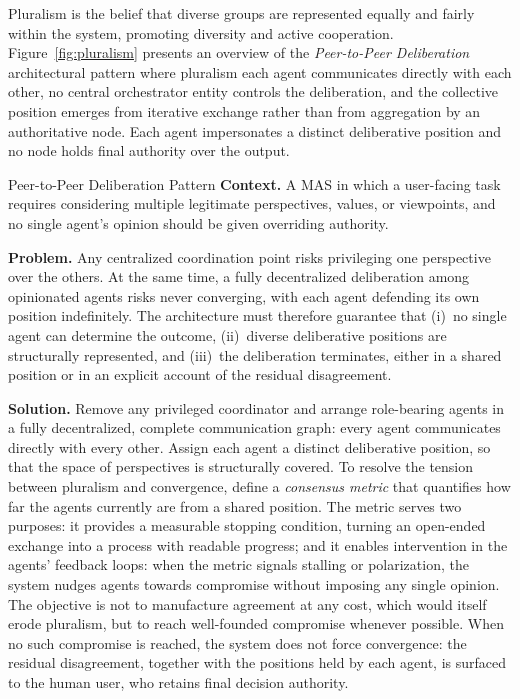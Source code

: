 \documentclass[sigconf,nonacm]{acmart}
\begin{document}
Pluralism is the belief that diverse groups are represented equally and fairly within the system, promoting diversity and active cooperation.
Figure~\ref{fig:pluralism} presents an overview of the \textit{Peer-to-Peer Deliberation} architectural pattern where pluralism each agent communicates directly with each other, no central orchestrator entity controls the deliberation, and the collective position
emerges from iterative exchange rather than from aggregation by an authoritative node.
Each agent impersonates a distinct deliberative position and no node holds final authority over the output.

\begin{discussionbox}{Peer-to-Peer Deliberation Pattern}
\textbf{Context.} A MAS in which a user-facing task requires
considering multiple legitimate perspectives, values, or viewpoints,
and no single agent's opinion should be given overriding authority.

\textbf{Problem.} Any centralized coordination point risks
privileging one perspective over the others. At the same time, a
fully decentralized deliberation among opinionated agents risks
never converging, with each agent defending its own position
indefinitely. The architecture must therefore guarantee that
(i)~no single agent can determine the outcome, (ii)~diverse
deliberative positions are structurally represented, and (iii)~the
deliberation terminates, either in a shared position or in an
explicit account of the residual disagreement.

\textbf{Solution.} Remove any privileged coordinator and arrange
role-bearing agents in a fully decentralized, complete communication
graph: every agent communicates directly with every other. Assign
each agent a distinct deliberative position, so that the space of
perspectives is structurally covered. To resolve the tension between
pluralism and convergence, define a \textit{consensus metric} that
quantifies how far the agents currently are from a shared position.
The metric serves two purposes: it provides a measurable stopping
condition, turning an open-ended exchange into a process with
readable progress; and it enables intervention in the agents'
feedback loops: when the metric signals stalling or polarization,
the system nudges agents towards compromise without imposing any
single opinion. The objective is not to manufacture agreement at any
cost, which would itself erode pluralism, but to reach well-founded
compromise whenever possible. When no such compromise is reached,
the system does not force convergence: the residual disagreement,
together with the positions held by each agent, is surfaced to the
human user, who retains final decision authority.
\end{discussionbox}
\end{document}
